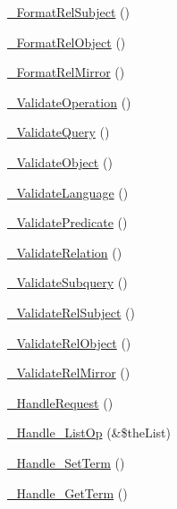 \begin{DoxyCompactItemize}
\item 
\hyperlink{class_c_ontology_wrapper_a6c5f76307abce4bbec7873b872452cc4}{\-\_\-\-Format\-Rel\-Subject} ()
\item 
\hyperlink{class_c_ontology_wrapper_a96ba7e0a267060ac2e1e13f885361125}{\-\_\-\-Format\-Rel\-Object} ()
\item 
\hyperlink{class_c_ontology_wrapper_ac2b2dbf74b54dba53bbf37bc3a0a3370}{\-\_\-\-Format\-Rel\-Mirror} ()
\item 
\hyperlink{class_c_ontology_wrapper_ab3c0f2985e63ebde5294f69e7d501ecb}{\-\_\-\-Validate\-Operation} ()
\item 
\hyperlink{class_c_ontology_wrapper_ae7f6ac49de190887d0d909edaba49862}{\-\_\-\-Validate\-Query} ()
\item 
\hyperlink{class_c_ontology_wrapper_a0a84083f3ba78aabf06d72d75bb3857c}{\-\_\-\-Validate\-Object} ()
\item 
\hyperlink{class_c_ontology_wrapper_aa3fb91ea57bbf16ceab2c80fc2aa52f8}{\-\_\-\-Validate\-Language} ()
\item 
\hyperlink{class_c_ontology_wrapper_a6dd38a830784c98b6da00f935e90b119}{\-\_\-\-Validate\-Predicate} ()
\item 
\hyperlink{class_c_ontology_wrapper_a9f720d10bd6ebe66801b3b1c2f96bf1d}{\-\_\-\-Validate\-Relation} ()
\item 
\hyperlink{class_c_ontology_wrapper_ae3b189d33f445d6182c2626cf914347d}{\-\_\-\-Validate\-Subquery} ()
\item 
\hyperlink{class_c_ontology_wrapper_a5102d350704cef1af5fb426c07bfaed6}{\-\_\-\-Validate\-Rel\-Subject} ()
\item 
\hyperlink{class_c_ontology_wrapper_a427fc121127a26c1c5ee114678f3f799}{\-\_\-\-Validate\-Rel\-Object} ()
\item 
\hyperlink{class_c_ontology_wrapper_ab748adddd32f9a703ea58921c1717613}{\-\_\-\-Validate\-Rel\-Mirror} ()
\item 
\hyperlink{class_c_ontology_wrapper_ad3cd51256856ae11799d51b8be692b75}{\-\_\-\-Handle\-Request} ()
\item 
\hyperlink{class_c_ontology_wrapper_a74d55eb1d9cc06402c788a0106622b12}{\-\_\-\-Handle\-\_\-\-List\-Op} (\&\$the\-List)
\item 
\hyperlink{class_c_ontology_wrapper_af17889957c64e8e97e2f013a5117a547}{\-\_\-\-Handle\-\_\-\-Set\-Term} ()
\item 
\hyperlink{class_c_ontology_wrapper_a64c0266dc4b914cf73863aa59caf0746}{\-\_\-\-Handle\-\_\-\-Get\-Term} ()
\item 

\end{DoxyCompactItemize}
